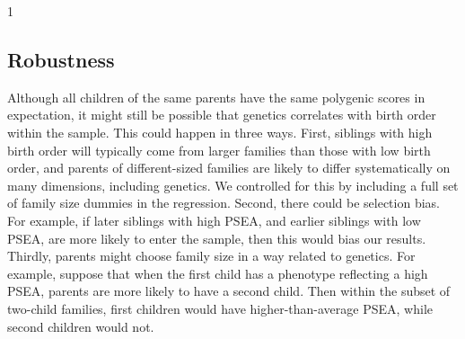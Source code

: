 \documentclass[
]{article}
\theoremstyle{definition}
\theoremstyle{definition}
\theoremstyle{definition}
\theoremstyle{definition}
\theoremstyle{remark}
\begin{document}
\begin{table}[ht]
\begin{centerbox}
\begin{threeparttable}
\begin{tabularx}{1\textwidth}
 \tabularnewline[-0.5pt]


\hhline{}
\end{tabularx}
\end{threeparttable}\par\end{centerbox}

\end{table}
 

\FloatBarrier

\hypertarget{robustness}{%
\subsection{Robustness}\label{robustness}}

Although all children of the same parents have the same polygenic scores
in expectation, it might still be possible that genetics correlates with
birth order within the sample. This could happen in three ways. First,
siblings with high birth order will typically come from larger families
than those with low birth order, and parents of different-sized families
are likely to differ systematically on many dimensions, including
genetics. We controlled for this by including a full set of family size
dummies in the regression. Second, there could be selection bias. For
example, if later siblings with high PSEA, and earlier siblings with low
PSEA, are more likely to enter the sample, then this would bias our
results. Thirdly, parents might choose family size in a way related to
genetics. For example, suppose that when the first child has a phenotype
reflecting a high PSEA, parents are more likely to have a second child.
Then within the subset of two-child families, first children would have
higher-than-average PSEA, while second children would not.
\end{document}

